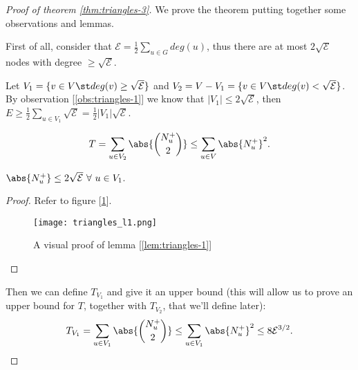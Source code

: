 \begin{proof}[Proof of theorem \ref{thm:triangles-3}]
    We prove the theorem putting together some observations and lemmas.
    
    \begin{obs}\label{obs:triangles-1}
        First of all, consider that $\mathcal{E} = \frac12 \sum_{u \in G} deg(u)$, thus there are at most $2 \sqrt{\mathcal{E}}$ nodes with degree $\geq \sqrt{\mathcal{E}}$.
    \end{obs}
    
    Let $V_1 = \{ v \in V \st deg(v) \geq \sqrt{\mathcal{E}} \}$ and $V_2 = V - V_1 = \{ v \in V \st deg(v) < \sqrt{\mathcal{E}} \}$.\\
    By observation [\ref{obs:triangles-1}] we know that $|V_1| \leq 2 \sqrt{\mathcal{E}}$, then $E \geq \frac12 \sum_{u \in V_1} \sqrt{\mathcal{E}} = \frac12 |V_1| \sqrt{\mathcal{E}}$.
    
    \begin{obs}\label{obs:triangles-2}
        \begin{equation}\label{eq:triangles-t}
            T = \sum_{u \in V_2} \abs{\binom{N_u^+}{2}} \leq \sum_{u \in V} \abs{N_u^+}^2.
        \end{equation}
    \end{obs} %

    \begin{lem}\label{lem:triangles-1}
        $\abs{N_u^+} \leq 2 \sqrt{\mathcal{E}}\ \forall\ u \in V_1$.
    \end{lem}
    \begin{proof}
        Refer to figure [\ref{fig:triangles-l1}].
        
        \begin{figure}
            \centering
            \texttt{[image: triangles\_l1.png]}
            \caption{A visual proof of lemma [\ref{lem:triangles-1}]}
            \label{fig:triangles-l1}
        \end{figure}
    \end{proof}

    Then we can define $T_{V_1}$ and give it an upper bound (this will allow us to prove an upper bound for $T$, together with $T_{V_2}$, that we'll define later):
    \begin{equation}\label{eq:triangles-tv1}
        T_{V_1} = \sum_{u \in V_1} \abs{\binom{N_u^+}{2}} \leq \sum_{u \in V_1} \abs{N_u^+}^2 \leq 8 \mathcal{E}^{3/2}.
    \end{equation}
    

\end{proof}
